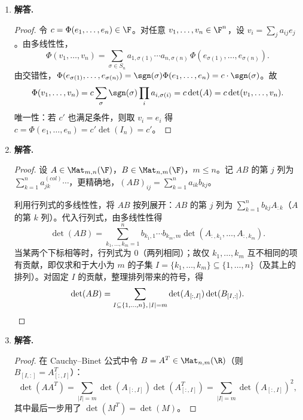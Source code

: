 \begin{enumerate}[label=\textbf{\arabic*.}, leftmargin=*, itemsep=1em]
\begin{proof}
  对任意 $j<n$，令 $x_n=x_j$：第 $j,n$ 两列相同，故 $V_n=0$，即 $(x_n-x_j)$ 整除 $V_n$。由此得
  \[
    V_n = c(x_1,\dots,x_{n-1})\prod_{j=1}^{n-1}(x_n-x_j),
  \]
  其中 $c$ 是关于 $x_1,\dots,x_{n-1}$ 的函数。比较 $x_n^{n-1}$ 的系数，$c$ 等于去掉最后一行最后一列所得 $(n-1)\times(n-1)$ Vandermonde 行列式 $V_{n-1}(x_1,\dots,x_{n-1})$，由归纳假设
  $c = \prod_{1\le i<j\le n-1}(x_j-x_i).$
  故
  \[
    V_n = \prod_{1\le i<j\le n-1}(x_j-x_i)\cdot\prod_{j=1}^{n-1}(x_n-x_j)
        = \prod_{1\le i<j\le n}(x_j-x_i). \qedhere
  \]
  \end{proof}

  \item \textbf{解答.}
  \begin{proof}
  令 $c=\Phi(e_1,\dots,e_n)\in\F$。对任意 $v_1,\dots,v_n\in\F^n$，设 $v_i=\sum_j a_{ij}e_j$。由多线性性，
  \[
    \Phi(v_1,\dots,v_n)=\sum_{\sigma\in S_n}a_{1,\sigma(1)}\cdots a_{n,\sigma(n)}\,\Phi(e_{\sigma(1)},\dots,e_{\sigma(n)}).
  \]
  由交错性，$\Phi(e_{\sigma(1)},\dots,e_{\sigma(n)})=\sgn(\sigma)\Phi(e_1,\dots,e_n)=c\cdot\sgn(\sigma)$。故
  \[
    \Phi(v_1,\dots,v_n)=c\sum_\sigma\sgn(\sigma)\prod_i a_{i,\sigma(i)}=c\det(A)=c\det(v_1,\dots,v_n).
  \]
  唯一性：若 $c'$ 也满足条件，则取 $v_i=e_i$ 得 $c=\Phi(e_1,\dots,e_n)=c'\det(I_n)=c'$。
  \end{proof}

  \item \textbf{解答.}
  \begin{proof}
  设 $A\in\Mat_{m,n}(\F)$，$B\in\Mat_{n,m}(\F)$，$m\le n$。记 $AB$ 的第 $j$ 列为 $\sum_{k=1}^n a_{jk}^{(col)}\cdots$，更精确地，$(AB)_{ij}=\sum_{k=1}^n a_{ik}b_{kj}$。

  利用行列式的多线性性，将 $AB$ 按列展开：$AB$ 的第 $j$ 列为 $\sum_{k=1}^n b_{kj}A_{:k}$（$A$ 的第 $k$ 列）。代入行列式，由多线性性得
  \[
    \det(AB)=\sum_{k_1,\dots,k_m=1}^n b_{k_1,1}\cdots b_{k_m,m}\det(A_{:,k_1},\dots,A_{:,k_m}).
  \]
  当某两个下标相等时，行列式为 $0$（两列相同）；故仅 $k_1,\dots,k_m$ 互不相同的项有贡献，即仅求和于大小为 $m$ 的子集 $I=\{k_1,\dots,k_m\}\subseteq\{1,\dots,n\}$（及其上的排列）。对固定 $I$ 的贡献，整理排列带来的符号，得
  \[
    \det(AB)=\sum_{I\subseteq\{1,\dots,n\},\,|I|=m}\det(A_{[:,I]})\det(B_{[I,:]}). \qedhere
  \]
  \end{proof}

  \item \textbf{解答.}
  \begin{proof}
  在 Cauchy--Binet 公式中令 $B=A^T\in\Mat_{n,m}(\R)$（则 $B_{[I,:]}=A_{[:,I]}^T$）：
  \[
    \det(AA^T)=\sum_{|I|=m}\det(A_{[:,I]})\det(A_{[:,I]}^T)
               =\sum_{|I|=m}\det(A_{[:,I]})^2,
  \]
  其中最后一步用了 $\det(M^T)=\det(M)$。
  \end{proof}


\end{enumerate}
